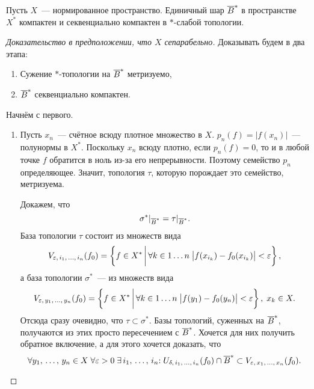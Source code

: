 \documentclass{notes}
\newcommand{\ta}{$*$}
\newcommand{\ssph}{\ov{B}^*}
\begin{document}
	\begin{thm} \label{thm:ban-al}
		Пусть $X$~--- нормированное пространство. Единичный шар $\ssph$ в пространстве $X^*$ компактен и секвенциально компактен в \ta-слабой топологии. 

		\begin{proof}[Доказательство в предположении, что $X$ сепарабельно]
			Доказывать будем в два этапа:
			\begin{enumerate}
				\item Сужение \ta-топологии на $\ssph$ метризуемо,
				\item $\ssph$ секвенциально компактен.
			\end{enumerate}
			Начнём с первого.
			\begin{enumerate}
				\item Пусть $x_n$~--- счётное всюду плотное множество в $X$. $p_n(f) = \big|f(x_n)\big|$~--- полунормы в $X^*$. Поскольку $x_n$ всюду плотно, если $p_n(f) = 0$, то и в любой точке $f$ обратится в ноль из-за его непрерывности. Поэтому семейство $p_n$ определяющее. Значит, топология $\tau$, которую порождает это семейство, метризуема.

				Докажем, что
				\[
					\sigma^*|_{\ssph} = \tau|_{\ssph}.
				\]
				База топологии $\tau$ состоит из множеств вида
				\[
					V_{\varepsilon, \, i_1, \, \ldots, \, i_n}(f_0) = \left\{f \in X^* \, \bigg | \, \forall k \in 1\ldots n \; \big|f(x_{i_k}) - f_0(x_{i_k})\big| < \varepsilon \right\},
				\]
				а база топологии $\sigma^*$~--- из множеств вида
				\[
					V_{\varepsilon, \, y_1, \, \ldots, \, y_n}(f_0) = \left\{f \in X^* \, \bigg | \, \forall k \in 1\ldots n \; \big|f(y_1) - f_0(y_n)\big| < \varepsilon \right\}, \; x_k \in X.
				\]
				Отсюда сразу очевидно, что $\tau \subset \sigma^*$.
				Базы топологий, суженных на $\ssph$, получаются из этих просто пересечением с $\ssph$. Хочется для них получить обратное включение, а для этого хочется доказать, что
				\[
					\all y_1, \, \ldots, \, y_n \in X \; \all \varepsilon > 0 \; \ex i_1, \, \ldots, \, i_n \col \; U_{\delta, \, i_1, \, \ldots, \, i_n}(f_0) \cap \ssph \subset V_{\varepsilon, \, x_1, \, \ldots, \, x_n}(f_0).
				\]


\end{enumerate}
\end{proof}
\end{thm}
\end{document}
